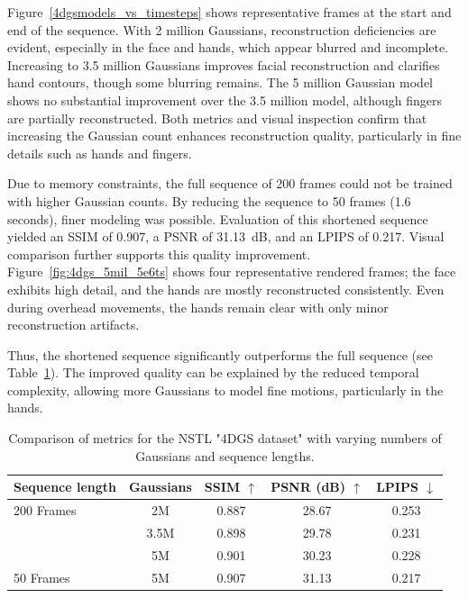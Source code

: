 Figure~\ref{4dgsmodels_vs_timesteps} shows representative frames at the start and end of the sequence. 
With 2 million Gaussians, reconstruction deficiencies are evident, especially in the face and hands, which appear blurred and incomplete. 
Increasing to 3.5 million Gaussians improves facial reconstruction and clarifies hand contours, though some blurring remains. 
The 5 million Gaussian model shows no substantial improvement over the 3.5 million model, although fingers are partially reconstructed. 
Both metrics and visual inspection confirm that increasing the Gaussian count enhances reconstruction quality, particularly in fine details such as hands and fingers.

Due to memory constraints, the full sequence of 200 frames could not be trained with higher Gaussian counts. 
By reducing the sequence to 50 frames (1.6 seconds), finer modeling was possible. 
Evaluation of this shortened sequence yielded an SSIM of 0.907, a PSNR of 31.13~dB, and an LPIPS of 0.217. 
Visual comparison further supports this quality improvement. 
Figure~\ref{fig:4dgs_5mil_5e6ts} shows four representative rendered frames; the face exhibits high detail, and the hands are mostly reconstructed consistently. 
Even during overhead movements, the hands remain clear with only minor reconstruction artifacts. 

Thus, the shortened sequence significantly outperforms the full sequence (see Table~\ref{tab:4dgs_metrics}). 
The improved quality can be explained by the reduced temporal complexity, allowing more Gaussians to model fine motions, particularly in the hands.

\begin{table}[h]
    \centering
    \caption{Comparison of metrics for the NSTL "4DGS dataset" with varying numbers of Gaussians and sequence lengths.}
    \label{tab:4dgs_metrics}
    \begin{tabular}{lcccc}
        \toprule
        Sequence length & Gaussians & SSIM $\uparrow$ & PSNR (dB) $\uparrow$ & LPIPS $\downarrow$ \\
        \midrule
        200 Frames & 2M   & 0.887 & 28.67 & 0.253 \\
                   & 3.5M & 0.898 & 29.78 & 0.231 \\
                   & 5M   & 0.901 & 30.23 & 0.228 \\
        \midrule
        50 Frames  & 5M  & 0.907 & 31.13 & 0.217 \\
        \bottomrule
    \end{tabular}
\end{table}

